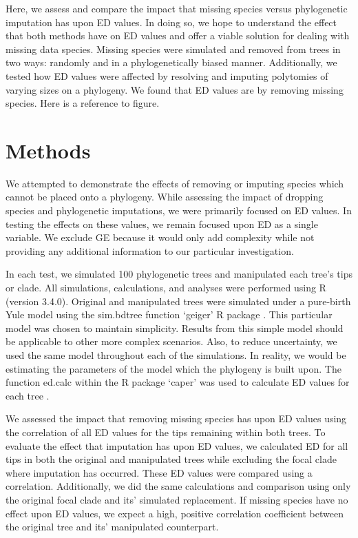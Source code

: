 \documentclass[12pt,english]{article}
\begin{document}
Here, we assess and compare the impact that missing species versus
phylogenetic imputation has upon ED values. In doing so, we hope to
understand the effect that both methods have on ED values and offer a
viable solution for dealing with missing data species. Missing species
were simulated and removed from trees in two ways: randomly and in a
phylogenetically biased manner. Additionally, we tested how ED values
were affected by resolving and imputing polytomies of varying sizes on
a phylogeny. We found that ED values are by removing missing
species. Here is a reference to figure.

\section*{Methods}
We attempted to demonstrate the effects of removing or imputing
species which cannot be placed onto a phylogeny. While assessing the
impact of dropping species and phylogenetic imputations, we were
primarily focused on ED values. In testing the effects on these
values, we remain focused upon ED as a single variable. We exclude GE
because it would only add complexity while not providing any
additional information to our particular investigation.

In each test, we simulated 100 phylogenetic trees and manipulated each
tree’s tips or clade. All simulations, calculations, and analyses were
performed using R (version 3.4.0). Original and manipulated trees were
simulated under a pure-birth Yule model using the sim.bdtree function
‘geiger’ R package \autocite{Harmon2007}. This particular model was
chosen to maintain simplicity. Results from this simple model should
be applicable to other more complex scenarios. Also, to reduce
uncertainty, we used the same model throughout each of the
simulations. In reality, we would be estimating the parameters of the
model which the phylogeny is built upon. The function ed.calc within
the R package ‘caper’ was used to calculate ED values for each tree
\autocite{Orme2013}.

We assessed the impact that removing missing species has upon ED
values using the correlation of all ED values for the tips remaining
within both trees. To evaluate the effect that imputation has upon ED
values, we calculated ED for all tips in both the original and
manipulated trees while excluding the focal clade where imputation has
occurred. These ED values were compared using a
correlation. Additionally, we did the same calculations and comparison
using only the original focal clade and its’ simulated replacement. If
missing species have no effect upon ED values, we expect a high,
positive correlation coefficient between the original tree and its’
manipulated counterpart.
\end{document}

